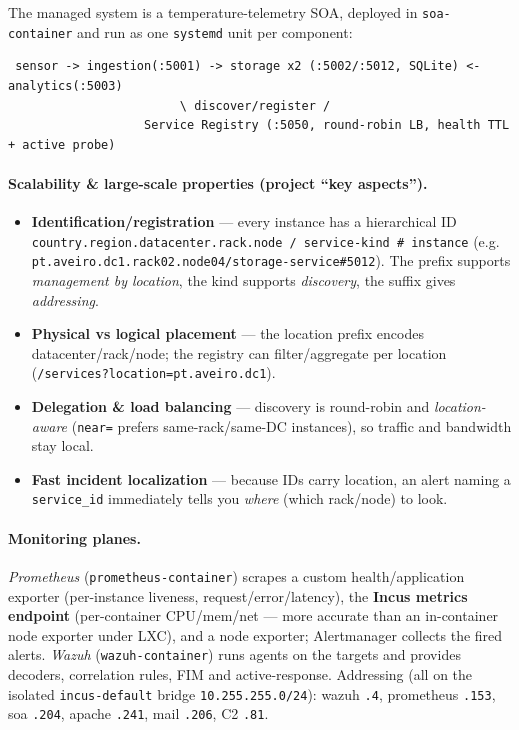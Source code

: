\documentclass[11pt,a4paper]{article}
\newcommand{\code}[1]{\texttt{\small #1}}
\begin{document}
The managed system is a temperature-telemetry SOA, deployed in \code{soa-container} and run as one
\code{systemd} unit per component:
\begin{lstlisting}
 sensor -> ingestion(:5001) -> storage x2 (:5002/:5012, SQLite) <- analytics(:5003)
                        \ discover/register /
                   Service Registry (:5050, round-robin LB, health TTL + active probe)
\end{lstlisting}

\paragraph{Scalability \& large-scale properties (project ``key aspects'').}
\begin{itemize}
  \item \textbf{Identification/registration} --- every instance has a hierarchical ID
        \code{country.region.datacenter.rack.node / service-kind \# instance} (e.g.
        \code{pt.aveiro.dc1.rack02.node04/storage-service\#5012}). The prefix supports
        \emph{management by location}, the kind supports \emph{discovery}, the suffix gives
        \emph{addressing}.
  \item \textbf{Physical vs logical placement} --- the location prefix encodes datacenter/rack/node;
        the registry can filter/aggregate per location
        (\code{/services?location=pt.aveiro.dc1}).
  \item \textbf{Delegation \& load balancing} --- discovery is round-robin and \emph{location-aware}
        (\code{near=} prefers same-rack/same-DC instances), so traffic and bandwidth stay local.
  \item \textbf{Fast incident localization} --- because IDs carry location, an alert naming a
        \code{service\_id} immediately tells you \emph{where} (which rack/node) to look.
\end{itemize}

\paragraph{Monitoring planes.}
\emph{Prometheus} (\code{prometheus-container}) scrapes a custom health/application exporter
(per-instance liveness, request/error/latency), the \textbf{Incus metrics endpoint} (per-container
CPU/mem/net --- more accurate than an in-container node exporter under LXC), and a node exporter;
Alertmanager collects the fired alerts. \emph{Wazuh} (\code{wazuh-container}) runs agents on the
targets and provides decoders, correlation rules, FIM and active-response. Addressing (all on the
isolated \code{incus-default} bridge \code{10.255.255.0/24}): wazuh \code{.4}, prometheus
\code{.153}, soa \code{.204}, apache \code{.241}, mail \code{.206}, C2 \code{.81}.
\end{document}

